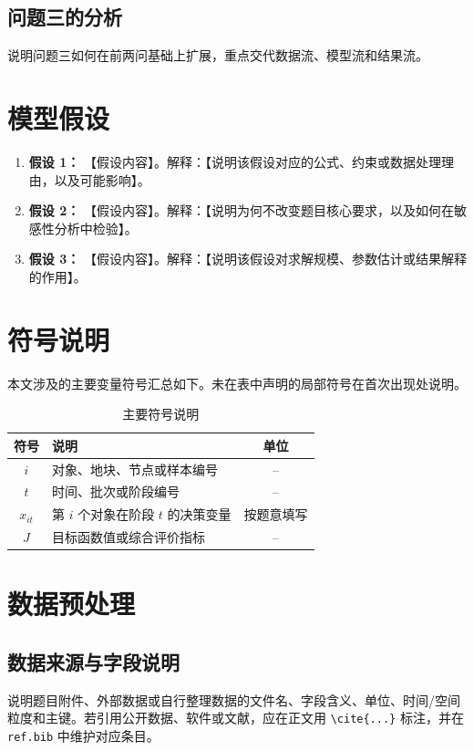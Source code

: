 \documentclass[withoutpreface,bwprint]{cumcmthesis}
\begin{document}
\subsection{问题三的分析}
说明问题三如何在前两问基础上扩展，重点交代数据流、模型流和结果流。

\section{模型假设}
\begin{enumerate}
  \item \textbf{假设 1：} 【假设内容】。解释：【说明该假设对应的公式、约束或数据处理理由，以及可能影响】。
  \item \textbf{假设 2：} 【假设内容】。解释：【说明为何不改变题目核心要求，以及如何在敏感性分析中检验】。
  \item \textbf{假设 3：} 【假设内容】。解释：【说明该假设对求解规模、参数估计或结果解释的作用】。
\end{enumerate}

\section{符号说明}
本文涉及的主要变量符号汇总如下。未在表中声明的局部符号在首次出现处说明。
\begin{table}[H]
  \centering
  \caption{主要符号说明}
  \label{tab:symbols}
  \begin{tabularx}{\textwidth}{cXc}
    \toprule
    符号 & 说明 & 单位 \\
    \midrule
    $i$ & 对象、地块、节点或样本编号 & -- \\
    $t$ & 时间、批次或阶段编号 & -- \\
    $x_{it}$ & 第 $i$ 个对象在阶段 $t$ 的决策变量 & 按题意填写 \\
    $J$ & 目标函数值或综合评价指标 & -- \\
    \bottomrule
  \end{tabularx}
\end{table}

\section{数据预处理}
\subsection{数据来源与字段说明}
说明题目附件、外部数据或自行整理数据的文件名、字段含义、单位、时间/空间粒度和主键。若引用公开数据、软件或文献，应在正文用 \verb|\cite{...}| 标注，并在 \texttt{ref.bib} 中维护对应条目。
\end{document}
